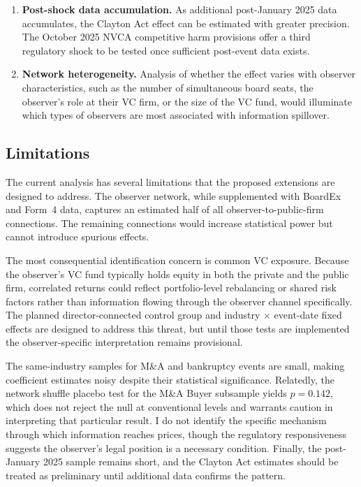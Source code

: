 \begin{enumerate}
\item \textbf{Post-shock data accumulation.} As additional post-January 2025 data accumulates, the Clayton Act effect can be estimated with greater precision. The October 2025 NVCA competitive harm provisions offer a third regulatory shock to be tested once sufficient post-event data exists.

\item \textbf{Network heterogeneity.} Analysis of whether the effect varies with observer characteristics, such as the number of simultaneous board seats, the observer's role at their VC firm, or the size of the VC fund, would illuminate which types of observers are most associated with information spillover.
\end{enumerate}

\subsection{Limitations}

The current analysis has several limitations that the proposed extensions are designed to address. The observer network, while supplemented with BoardEx and Form~4 data, captures an estimated half of all observer-to-public-firm connections. The remaining connections would increase statistical power but cannot introduce spurious effects.

The most consequential identification concern is common VC exposure. Because the observer's VC fund typically holds equity in both the private and the public firm, correlated returns could reflect portfolio-level rebalancing or shared risk factors rather than information flowing through the observer channel specifically. The planned director-connected control group and industry $\times$ event-date fixed effects are designed to address this threat, but until those tests are implemented the observer-specific interpretation remains provisional.

The same-industry samples for M\&A and bankruptcy events are small, making coefficient estimates noisy despite their statistical significance. Relatedly, the network shuffle placebo test for the M\&A Buyer subsample yields $p = 0.142$, which does not reject the null at conventional levels and warrants caution in interpreting that particular result. I do not identify the specific mechanism through which information reaches prices, though the regulatory responsiveness suggests the observer's legal position is a necessary condition. Finally, the post-January 2025 sample remains short, and the Clayton Act estimates should be treated as preliminary until additional data confirms the pattern.
